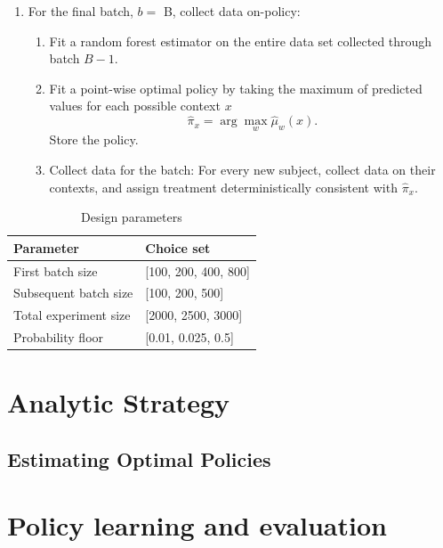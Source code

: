 \documentclass[letterpaper, 12pt, parskip=full,DIV=12]{scrartcl}
\begin{document}
\begin{enumerate}
\item For the final batch,  $b = $ B, collect data on-policy:
\begin{enumerate}
  \item Fit a random forest estimator on the entire data set collected through batch $B-1$.
  \item Fit a point-wise optimal policy  by taking the maximum of predicted values for each possible context $x$ 
    \begin{equation*}
     \hat{\pi}_{x} = \arg\max_{ w } \hat{\mu}_{w}(x) . 
    \end{equation*} 
  Store the policy. 
  \item Collect data for the batch: For every new subject, collect data on their contexts, and assign treatment deterministically consistent with $\hat{\pi}_{x}$. 
\end{enumerate}
\end{enumerate}


\begin{table}[H]
\centering
\caption{Design parameters}
\label{tab:design}
\begin{tabular}{l | l}
\textbf{Parameter} & \textbf{Choice set} \\ \hline
First batch size & [100, 200, 400, 800] \\
Subsequent batch size & [100, 200, 500] \\
Total experiment size & [2000, 2500, 3000] \\
Probability floor & [0.01, 0.025, 0.5]\\
\hline
\end{tabular}
\end{table}

\section{Analytic Strategy}
\subsection{Estimating Optimal Policies}






\section{Policy learning and evaluation}
\end{document}
